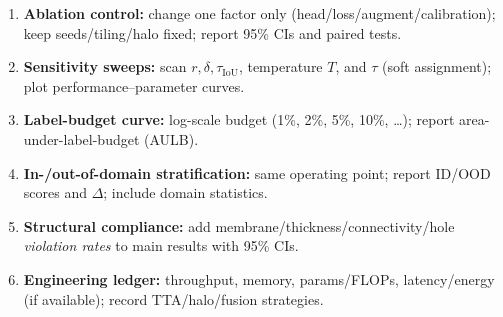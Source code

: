 \medskip
\begin{enumerate}
  \item \textbf{Ablation control:} change one factor only (head/loss/augment/calibration); keep seeds/tiling/halo fixed; report 95\% CIs and paired tests.
  \item \textbf{Sensitivity sweeps:} scan \(r,\delta,\tau_{\mathrm{IoU}}\), temperature \(T\), and \(\tau\) (soft assignment); plot performance--parameter curves.
  \item \textbf{Label-budget curve:} log-scale budget (1\%, 2\%, 5\%, 10\%, \dots); report area-under-label-budget (AULB).
  \item \textbf{In-/out-of-domain stratification:} same operating point; report ID/OOD scores and \(\Delta\); include domain statistics.
  \item \textbf{Structural compliance:} add membrane/thickness/connectivity/hole \emph{violation rates} to main results with 95\% CIs.
  \item \textbf{Engineering ledger:} throughput, memory, params/FLOPs, latency/energy (if available); record TTA/halo/fusion strategies.
\end{enumerate}